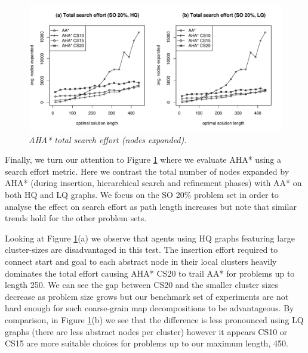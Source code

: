 \begin{figure}[htbp]
	\vspace{-12pt}
	\caption{\small{\emph{AHA* total search effort (nodes expanded).}}}
	\begin{center}
		       \includegraphics[scale=0.35, trim = 20mm 17mm 20mm 5mm]{diagrams/searcheffort.pdf}
	\end{center}
	\label{aha-fig:searcheffort}
	\vspace{-5pt}
\end{figure}
%
\par \indent
Finally, we turn our attention to Figure \ref{aha-fig:searcheffort} where we evaluate AHA* using a search effort metric.
Here we contrast the total number of nodes expanded by AHA* (during insertion, hierarchical search and refinement phases) with AA* on both HQ and LQ graphs.
We focus on the SO 20\% problem set in order to analyse the effect on search effort as path length increases but note that similar trends hold for the other problem sets.
\par \indent
Looking at Figure \ref{aha-fig:searcheffort}(a) we observe that agents using HQ graphs featuring large cluster-sizes are disadvantaged in this test. 
The insertion effort required to connect start and goal to each abstract node in their local clusters heavily dominates the total effort causing AHA* CS20 to trail AA* for problems up to length 250.
We can see the gap between CS20 and the smaller cluster sizes decrease as problem size grows but our benchmark set of experiments are not hard enough for such coarse-grain map decompositions to be advantageous. 
By comparison, in Figure \ref{aha-fig:searcheffort}(b) we see that the difference is less pronounced using LQ graphs (there are less abstract nodes per cluster) however it appears CS10 or CS15 are more suitable choices for problems up to our maximum length, 450.
